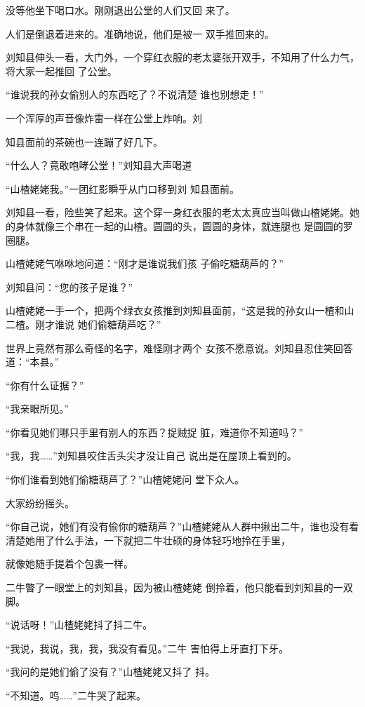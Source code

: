 \documentclass{article}
\begin{document}
没等他坐下喝口水。刚刚退出公堂的人们又回
来了。 

人们是倒退着进来的。准确地说，他们是被一
双手推回来的。 

刘知县伸头一看，大门外，一个穿红衣服的老太婆张开双手，不知用了什么力气，将大家一起推回
了公堂。 

“谁说我的孙女偷别人的东西吃了？不说清楚
谁也别想走！” 

一个浑厚的声音像炸雷一样在公堂上炸响。刘
\newpage

知县面前的茶碗也一连蹦了好几下。 

“什么人？竟敢咆哮公堂！”刘知县大声喝道

“山楂姥姥我。”一团红影瞬乎从门口移到刘
知县面前。 

刘知县一看，险些笑了起来。这个穿一身红衣服的老太太真应当叫做山楂姥姥。她的身体就像三个串在一起的山楂。圆圆的头，圆圆的身体，就连腿也
是圆圆的罗圈腿。 

山楂姥姥气咻咻地问道：“刚才是谁说我们孩
子偷吃糖葫芦的？” 


刘知县问：“您的孩子是谁？” 

山楂姥姥一手一个，把两个绿衣女孩推到刘知县面前，“这是我的孙女山一楂和山二楂。刚才谁说
她们偷糖葫芦吃？” 

\newpage

世界上竟然有那么奇怪的名字，难怪刚才两个
女孩不愿意说。刘知县忍住笑回答道：“本县。” 


“你有什么证据？” 


“我亲眼所见。” 

“你看见她们哪只手里有别人的东西？捉贼捉
脏，难道你不知道吗？” 

“我，我……”刘知县咬住舌头尖才没让自己
说出是在屋顶上看到的。 

“你们谁看到她们偷糖葫芦了？”山楂姥姥问
堂下众人。 


大家纷纷摇头。 

“你自己说，她们有没有偷你的糖葫芦？”山楂姥姥从人群中揪出二牛，谁也没有看清楚她用了什么手法，一下就把二牛壮硕的身体轻巧地拎在手里，
\newpage

就像她随手提着个包裹一样。 

二牛瞥了一眼堂上的刘知县，因为被山楂姥姥
倒拎着，他只能看到刘知县的一双脚。 


“说话呀！”山楂姥姥抖了抖二牛。 

“我说，我说，我，我，我没有看见。”二牛
害怕得上牙直打下牙。 

“我问的是她们偷了没有？”山楂姥姥又抖了
抖。 


“不知道。呜……”二牛哭了起来。 
\end{document}
